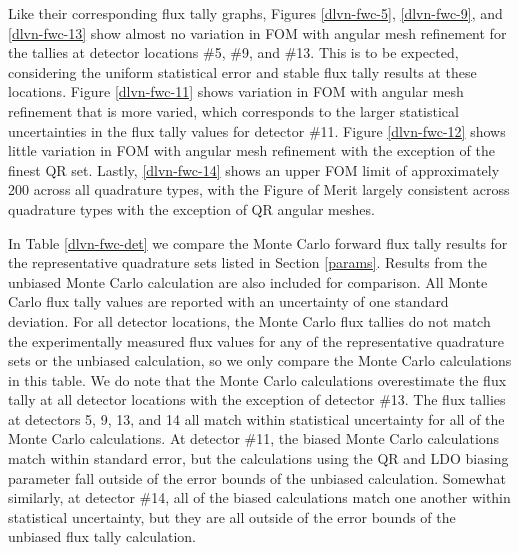 \documentclass{article} %
\begin{document}
Like their corresponding flux tally graphs, Figures \ref{dlvn-fwc-5},
\ref{dlvn-fwc-9}, and \ref{dlvn-fwc-13} show almost no variation in FOM with
angular mesh refinement for the tallies at detector locations \#5, \#9, and
\#13. This is to be expected, considering the uniform statistical error and
stable flux tally results at these locations. Figure \ref{dlvn-fwc-11} shows
variation in FOM with angular mesh refinement that is more varied, which
corresponds to the larger statistical uncertainties in the flux tally values
for detector \#11. Figure \ref{dlvn-fwc-12} shows little variation in FOM with
angular mesh refinement with the exception of the finest QR set. Lastly,
\ref{dlvn-fwc-14} shows an upper FOM limit of approximately 200 across all
quadrature types, with the Figure of Merit largely consistent across
quadrature types with the exception of QR angular meshes.

In Table \ref{dlvn-fwc-det} we compare the Monte Carlo forward flux tally
results for the representative quadrature sets listed in Section \ref{params}.
Results from the unbiased Monte Carlo calculation are also included for
comparison. All Monte Carlo flux tally values are reported with an uncertainty
of one standard deviation. For all detector locations, the Monte Carlo flux
tallies do not match the experimentally measured flux values for any of the
representative quadrature sets or the unbiased calculation, so we only compare
the Monte Carlo calculations in this table. We do note that the Monte Carlo
calculations overestimate the flux tally at all detector locations with the
exception of detector \#13. The flux tallies at detectors 5, 9, 13, and 14 all
match within statistical uncertainty for all of the Monte Carlo calculations.
At detector \#11, the biased Monte Carlo calculations match within standard
error, but the calculations using the QR and LDO biasing parameter fall outside
of the error bounds of the unbiased calculation. Somewhat similarly, at
detector \#14, all of the biased calculations match one another within
statistical uncertainty, but they are all outside of the error bounds of the
unbiased flux tally calculation.
\end{document}
